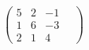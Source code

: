\documentclass[preview]{standalone}
\begin{document}
\begin{align*}
\quad\\ \begin{pmatrix} 5 & 2 & -1 \quad\\ 1 & 6 & -3 \quad\\ 2 & 1 & 4 \end{pmatrix}
\end{align*}
\end{document}
